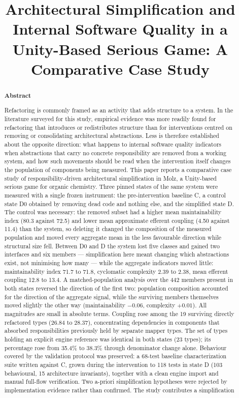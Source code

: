 \documentclass{sbc2019}%
\title[Architectural Simplification and Internal Software Quality]{Architectural Simplification and Internal Software Quality in a Unity-Based Serious Game: A Comparative Case Study}
\author[Rezende and Rocha 2026]{\affil{\textbf{Jo\~ao Guilherme Benjamin Alves de Rezende}\quad[~\textbf{Universidade Federal do Agreste de Pernambuco~}|\href{mailto:benj7100@gmail.com}{~\textbf{\textit{benj7100@gmail.com}}} ]}

\affil{\textbf{Rodrigo Gusm\~ao de Carvalho Rocha}\quad[~\textbf{Universidade Federal do Agreste de Pernambuco~}|\href{mailto:rodrigo.rocha@ufape.edu.br}{~\textbf{\textit{rodrigo.rocha@ufape.edu.br}}} ]}
}
\begin{document}
\begin{frontmatter}
\maketitle

\begin{abstract}
\textbf{Abstract}

Refactoring is commonly framed as an activity that adds structure to a system. In the literature surveyed for this study, empirical evidence was more readily found for refactoring that introduces or redistributes structure than for interventions centred on removing or consolidating architectural abstractions. Less is therefore established about the opposite direction: what happens to internal software quality indicators when abstractions that carry no concrete responsibility are removed from a working system, and how such movements should be read when the intervention itself changes the population of components being measured. This paper reports a comparative case study of responsibility-driven architectural simplification in Molz, a Unity-based serious game for organic chemistry. Three pinned states of the same system were measured with a single frozen instrument: the pre-intervention baseline C, a control state D0 obtained by removing dead code and nothing else, and the simplified state D. The control was necessary: the removed subset had a higher mean maintainability index (80.3 against 72.5) and lower mean approximate efferent coupling (4.50 against 11.4) than the system, so deleting it changed the composition of the measured population and moved every aggregate mean in the less favourable direction while structural size fell. Between D0 and D the system lost five classes and gained two interfaces and six members --- simplification here meant changing which abstractions exist, not minimising how many --- while the aggregate indicators moved little: maintainability index 71.7 to 71.8, cyclomatic complexity 2.39 to 2.38, mean efferent coupling 12.8 to 13.4. A matched-population analysis over the 442 members present in both states reversed the direction of the first two: population composition accounted for the direction of the aggregate signal, while the surviving members themselves moved slightly the other way (maintainability $-0.06$, complexity $+0.01$). All magnitudes are small in absolute terms. Coupling rose among the 19 surviving directly refactored types (26.84 to 28.37), concentrating dependencies in components that absorbed responsibilities previously held by separate mapper types. The set of types holding an explicit engine reference was identical in both states (23 types); its percentage rose from 35.4\% to 38.3\% through denominator change alone. Behaviour covered by the validation protocol was preserved: a 68-test baseline characterization suite written against C, grown during the intervention to 118 tests in state D (103 behavioural, 15 architecture invariants), together with a clean engine import and manual full-flow verification. Two a-priori simplification hypotheses were rejected by implementation evidence rather than confirmed. The study contributes a simplification 
\end{abstract}
\end{frontmatter}
\end{document}
